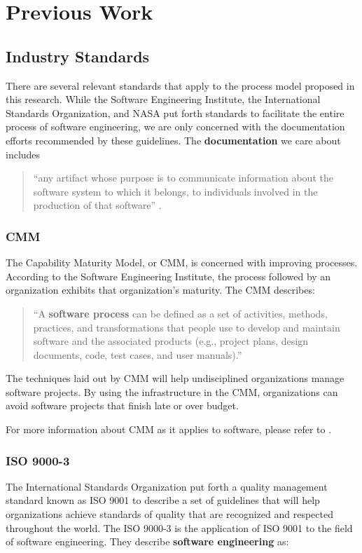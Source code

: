 \section{Previous Work}\label{previous}

\subsection{Industry Standards}
There are several relevant standards that apply to the process model proposed in
this research. While the Software Engineering Institute, the International
Standards Organization, and NASA put forth standards to facilitate the entire
process of software engineering, we are only concerned with the documentation
efforts recommended by these guidelines. The \textbf{documentation} we care
about includes 
\begin{quote}
``any artifact whose purpose is to communicate information about the software
system to which it belongs, to individuals involved in the production of that
software'' \cite{Forward2002}.
\end{quote}

\subsubsection{CMM}
The Capability Maturity Model, or CMM, is concerned with improving processes.
According to the Software Engineering Institute, the process followed by an
organization exhibits that organization's maturity. The CMM describes:

\begin{quote}\label{process}
``A \textbf{software process} can be defined as a set of activities, methods,
practices, and transformations that people use to develop and maintain software
and the associated products (e.g., project plans, design documents, code, test
cases, and user manuals).'' \cite{CMM11}
\end{quote}

The techniques laid out by CMM will help undisciplined organizations manage
software projects. By using the infrastructure in the CMM, organizations can 
avoid software projects that finish late or over budget.

For more information about CMM as it applies to software, please refer to
\cite{CMM11}.

\subsubsection{ISO 9000-3}
The International Standards Organization put forth a quality management standard
known as ISO 9001 to describe a set of guidelines that will help organizations
achieve standards of quality that are recognized and respected throughout the
world. The ISO 9000-3 is the application of ISO 9001 to the field of software
engineering. They describe \textbf{software engineering} as: 

